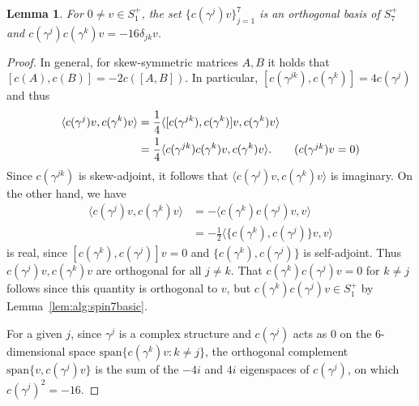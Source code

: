 \documentclass{article}
\newcommand{\vspan}{\mathrm{span}}
\newtheorem{lemma}[theorem]{Lemma}
\theoremstyle{definition}
\theoremstyle{remark}
\begin{document}
\begin{lemma}
    \label{lem:alg:seigen}
    For $0 \neq v \in S^+_1$, the set $\{c(\gamma^j)v\}_{j=1}^7$ is an orthogonal basis of $S^+_7$ and $c(\gamma^j)c(\gamma^k)v = -16\delta_{jk} v$.
\end{lemma}
\begin{proof}
    In general, for skew-symmetric matrices $A, B$ it holds that $[c(A), c(B)] = -2c([A,B])$.
    In particular, $[c(\gamma^{jk}), c(\gamma^k)] = 4c(\gamma^j)$ and thus
    \begin{align*}
        \langle c(\gamma^j)v, c(\gamma^k)v \rangle &= \frac{1}{4}\langle [c(\gamma^{jk}), c(\gamma^k)] v, c(\gamma^k) v \rangle \\
                                                   &= \frac{1}{4}\langle c(\gamma^{jk}) c(\gamma^k) v, c(\gamma^k) v \rangle. \tag{$c(\gamma^{jk})v = 0$}
    \end{align*}
    Since $c(\gamma^{jk})$ is skew-adjoint, it follows that $\langle c(\gamma^j)v, c(\gamma^k)v\rangle$ is imaginary.
    On the other hand, we have
    \begin{align*}
        \langle c(\gamma^j)v, c(\gamma^k)v\rangle &= -\langle c(\gamma^k) c(\gamma^j) v, v\rangle \\
                                                  &= -\frac{1}{2} \langle  \{ c(\gamma^k), c(\gamma^j)\} v, v \rangle
    \end{align*}
    is real, since $[c(\gamma^k), c(\gamma^j)] v = 0$ and $\{c(\gamma^k), c(\gamma^j)\}$ is self-adjoint.
    Thus $c(\gamma^j)v, c(\gamma^k)v$ are orthogonal for all $j \neq k$.
That $c(\gamma^k)c(\gamma^j)v = 0$ for $k \neq j$ follows since this quantity is orthogonal to $v$, but $c(\gamma^k)c(\gamma^j)v \in S^+_1$ by Lemma~\ref{lem:alg:spin7basic}.

    For a given $j$, since $\gamma^j$ is a complex structure and $c(\gamma^j)$ acts as 0 on the 6-dimensional space $\vspan \{ c(\gamma^k)v : k \neq j\}$, the orthogonal complement $\vspan\{v, c(\gamma^j)v\}$ is the sum of the $-4i$ and $4i$ eigenspaces of $c(\gamma^j)$, on which $c(\gamma^j)^2 = -16$.
\end{proof}
\end{document}
